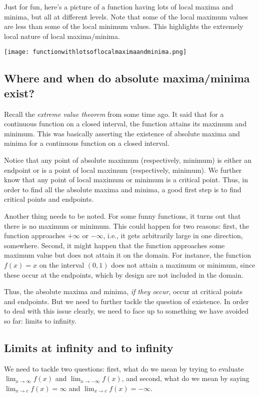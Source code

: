\documentclass{amsart}
\begin{document}
Just for fun, here's a picture of a function having lots of local
maxima and minima, but all at different levels. Note that some of the
local maximum values are less than some of the local minimum
values. This highlights the extremely local nature of local maxima/minima.

\texttt{[image: functionwithlotsoflocalmaximaandminima.png]}

\subsection{Where and when do absolute maxima/minima exist?}

Recall the {\em extreme value theorem} from some time ago. It said
that for a continuous function on a closed interval, the function
attains its maximum and minimum. This was basically asserting the
existence of absolute maxima and minima for a continuous function on a
closed interval.

Notice that any point of absolute maximum (respectively, minimum) is
either an endpoint or is a point of local maximum (respectively,
minimum). We further know that any point of local maximum or minimum
is a critical point. Thus, in order to find all the absolute maxima
and minima, a good first step is to find critical points and
endpoints.

Another thing needs to be noted. For some funny functions, it turns
out that there is no maximum or minimum. This could happen for two
reasons: first, the function approaches $+\infty$ or $-\infty$, i.e.,
it gets arbitrarily large in one direction, somewhere. Second, it
might happen that the function approaches some maximum value but does
not attain it on the domain. For instance, the function $f(x) = x$ on
the interval $(0,1)$ does not attain a maximum or minimum, since these
occur at the endpoints, which by design are not included in the
domain.

Thus, the absolute maxima and minima, {\em if they occur}, occur at
critical points and endpoints. But we need to further tackle the
question of existence. In order to deal with this issue clearly, we
need to face up to something we have avoided so far: limits to
infinity.

\subsection{Limits at infinity and to infinity}

We need to tackle two questions: first, what do we mean by trying to
evaluate $\lim_{x \to \infty} f(x)$ and $\lim_{x \to -\infty} f(x)$,
and second, what do we mean by saying $\lim_{x \to c} f(x) = \infty$
and $\lim_{x \to c} f(x) = -\infty$.
\end{document}
